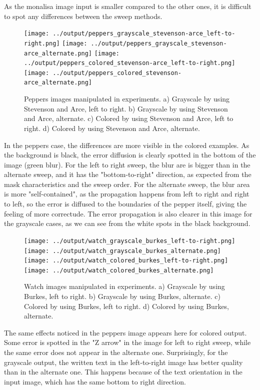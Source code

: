 \documentclass[]{IEEEtran}
\begin{document}
As the monalisa image input is smaller compared to the other ones, it is difficult to spot any differences between the sweep methods.

\begin{figure}[H]
  \centering
  \texttt{[image: ../output/peppers\_grayscale\_stevenson-arce\_left-to-right.png]}
  \texttt{[image: ../output/peppers\_grayscale\_stevenson-arce\_alternate.png]}
  \texttt{[image: ../output/peppers\_colored\_stevenson-arce\_left-to-right.png]}
  \texttt{[image: ../output/peppers\_colored\_stevenson-arce\_alternate.png]}
  \caption{Peppers images manipulated in experiments. a) Grayscale by using Stevenson and Arce, left to right. b) Grayscale by using Stevenson and Arce, alternate. c) Colored by using Stevenson and Arce, left to right. d) Colored by using Stevenson and Arce, alternate.}
  \label{fig:sweep-peppers}
\end{figure}

In the peppers case, the differences are more visible in the colored examples. As the background is black, the error diffusion is clearly spotted in the bottom of the image (green blur). For the left to right sweep, the blur are is bigger than in the alternate sweep, and it has the "bottom-to-right" direction, as expected from the mask characteristics and the sweep order. For the alternate sweep, the blur area is more "self-contained", as the propagation happens from left to right and right to left, so the error is diffused to the boundaries of the pepper itself, giving the feeling of more correctude. The error propagation is also clearer in this image for the grayscale cases, as we can see from the white spots in the black background.

\begin{figure}[H]
  \centering
  \texttt{[image: ../output/watch\_grayscale\_burkes\_left-to-right.png]}
  \texttt{[image: ../output/watch\_grayscale\_burkes\_alternate.png]}
  \texttt{[image: ../output/watch\_colored\_burkes\_left-to-right.png]}
  \texttt{[image: ../output/watch\_colored\_burkes\_alternate.png]}
  \caption{Watch images manipulated in experiments. a) Grayscale by using Burkes, left to right. b) Grayscale by using Burkes, alternate. c) Colored by using Burkes, left to right. d) Colored by using Burkes, alternate.}
  \label{fig:sweep-watch}
\end{figure}

The same effects noticed in the peppers image appears here for colored output. Some error is spotted in the "Z arrow" in the image for left to right sweep, while the same error does not appear in the alternate one. Surprisingly, for the grayscale output, the written text in the left-to-right image has better quality than in the alternate one. This happens because of the text orientation in the input image, which has the same bottom to right direction. 
\end{document}
